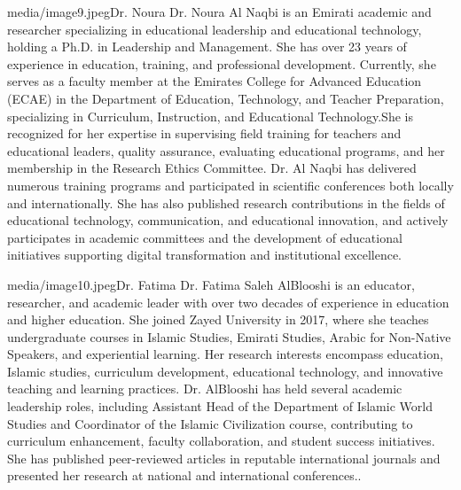\documentclass[10pt]{NSP1}
\begin{document}
\begin{biographyps}{media/image9.jpeg}{Dr. Noura}
Dr. Noura Al Naqbi is an Emirati academic and researcher specializing in educational leadership and educational technology, holding a Ph.D. in Leadership and Management. She has over 23 years of experience in education, training, and professional development. Currently, she serves as a faculty member at the Emirates College for Advanced Education (ECAE) in the Department of Education, Technology, and Teacher Preparation, specializing in Curriculum, Instruction, and Educational Technology.She is recognized for her expertise in supervising field training for teachers and educational leaders, quality assurance, evaluating educational programs, and her membership in the Research Ethics Committee. Dr. Al Naqbi has delivered numerous training programs and participated in scientific conferences both locally and internationally. She has also published research contributions in the fields of educational technology, communication, and educational innovation, and actively participates in academic committees and the development of educational initiatives supporting digital transformation and institutional excellence.\end{biographyps}

\begin{biographyps}{media/image10.jpeg}{Dr. Fatima}
Dr. Fatima Saleh AlBlooshi is an educator, researcher, and academic leader with over two decades of experience in education and higher education. She joined Zayed University in 2017, where she teaches undergraduate courses in Islamic Studies, Emirati Studies, Arabic for Non-Native Speakers, and experiential learning. Her research interests encompass education, Islamic studies, curriculum development, educational technology, and innovative teaching and learning practices. Dr. AlBlooshi has held several academic leadership roles, including Assistant Head of the Department of Islamic World Studies and Coordinator of the Islamic Civilization course, contributing to curriculum enhancement, faculty collaboration, and student success initiatives. She has published peer-reviewed articles in reputable international journals and presented her research at national and international conferences..\end{biographyps}
\end{document}
